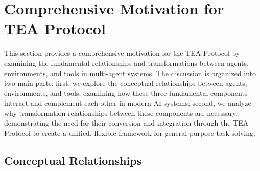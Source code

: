 \documentclass[11pt]{article}
\begin{document}
\appendix
\label{sec:appendix}
\newpage
\onecolumn
\appendixpage

\section{Comprehensive Motivation for TEA Protocol}
\label{appx_sec:comprehensive_motivation}

This section provides a comprehensive motivation for the TEA Protocol by examining the fundamental relationships and transformations between agents, environments, and tools in multi-agent systems. The discussion is organized into two main parts: first, we explore the conceptual relationships between agents, environments, and tools, examining how these three fundamental components interact and complement each other in modern AI systems; second, we analyze why transformation relationships between these components are necessary, demonstrating the need for their conversion and integration through the TEA Protocol to create a unified, flexible framework for general-purpose task solving.

\subsection{Conceptual Relationships}


\end{document}
